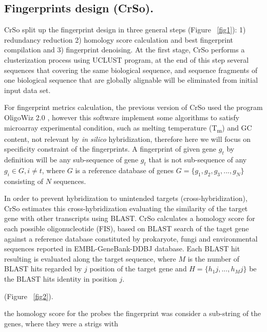 \documentclass[10pt,letterpaper]{article}
\begin{document}
\subsection*{Fingerprints design (CrSo).}

CrSo split up the fingerprint design in three general steps (Figure ~\ref{fig1}): 1) redundancy reduction 2) homology score calculation and best fingerprint compilation and 3) fingerprint denoising. At the first stage, CrSo performs a clusterization process using UCLUST \cite{Edgar:2010cv} program, at the end of this step several sequences that covering the same biological sequence, and sequence fragments of one biological sequence that are globally alignable will be eliminated from initial input data set.

For fingerprint metrics calculation, the previous version of CrSo used the program OligoWiz 2.0 \cite{Wernersson:2005ee}, however this software implement some algorithms to satisfy microarray experimental condition, such as melting temperature (T\textsubscript{m}) and GC content, not relevant by \textit{in silico} hybridization, therefore here we will focus on specificity constraint of the fingerprints. A fingerprint of given gene $g_t$ by definition will be any sub-sequence of gene $g_t$ that is not sub-sequence of any $g_i \in G, i \neq t$, where $G$ is a reference database of genes $G = \{g_1,g_2,g_3,...,g_N\}$ consisting of $N$ sequences. 

In order to prevent hybridization to unintended targets (cross-hybridization), CrSo estimates this cross-hybridization evaluating the similarity of the target gene with other transcripts using BLAST. CrSo calculates a homology score for each possible oligonucleotide (FIS), based on BLAST search of the taget gene against a reference database constituted by prokaryote, fungi and environmental sequences reported in EMBL-GeneBank-DDBJ \cite{Benson:2009fc} database. Each BLAST hit resulting is evaluated along the target sequence, where $M$ is the number of BLAST hits regarded by $j$ position of the target gene and $H = \{h_1j,...,h_Mj\}$ be the BLAST hits identity in position $j$.



(Figure ~\ref{fig2}).

 the homology score for the probes the fingerprint was consider a sub-string of the genes, where they were a strigs with 

  
\end{document}
